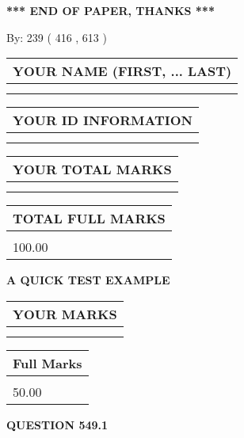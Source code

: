 \documentclass[12pt]{article}
\begin{document}
\vspace{1.0in} 
{\textbf{\large{ *** END OF PAPER, THANKS *** }}} 
   
   
\hspace{1.0in} By: 
 239 ( 416 ,  613 )
   
   
   
   
\newpage 
\setcounter{page}{ 
   549001 } 
   
   
   
   
\noindent\begin{tabular}{|l|}
\hline
YOUR NAME (FIRST, ... LAST)  \\
\hline
 \\ 
 \\ 
\hline
\end{tabular}
\hspace{0.05in} \begin{tabular}{|l|}
\hline
 YOUR   ID   INFORMATION  \\
\hline
 \\ 
 \\ 
\hline
\end{tabular}
   
   
\vspace{0.2in}\noindent\begin{tabular}{|l|}
\hline
YOUR TOTAL MARKS  \\
\hline
 \\ 
 \\ 
\hline
\end{tabular}
\hspace{0.05in} \begin{tabular}{|l|}
\hline
TOTAL FULL MARKS  \\
\hline
 \\ 
100.00 \\
\hline
\end{tabular}
   
   
 \vspace{0.2in}
{\LARGE {\textbf{ A QUICK TEST EXAMPLE}}}
   
   
  
\vspace{0.2in}
  
\noindent\begin{tabular}{|l|}
\hline
 YOUR MARKS  \\
\hline
 \\ 
 \\ 
\hline
\end{tabular}
\hspace{0.05in} \begin{tabular}{|l|}
\hline
 Full Marks  \\
\hline
 \\ 
50.00 \\
\hline
\end{tabular}
{\textbf{\Large{QUESTION
549.1 
}}}
  
\end{document}

